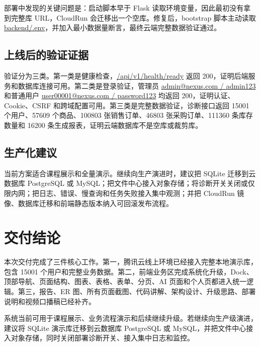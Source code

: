 \documentclass[UTF8,zihao=-4]{ctexart}
\newcommand{\code}[1]{{\small\url{#1}}}
\begin{document}
部署中发现的关键问题是：启动脚本早于 Flask 读取环境变量，因此最初没有拿到完整库 URL，CloudRun 会迁移出一个空库。修复后，bootstrap 脚本主动读取 \code{backend/.env}，并加入最小数据量断言，最终云端完整数据验证通过。

\subsection{上线后的验证证据}
验证分为三类。第一类是健康检查，\code{/api/v1/health/ready} 返回 200，证明后端服务和数据库连接可用。第二类是登录验证，管理员 \code{admin@nexus.com / admin123} 和普通用户 \code{user00001@nexus.com / password123} 均返回 200，证明认证、Cookie、CSRF 和跨域配置可用。第三类是完整数据验证，诊断接口返回 15001 个用户、57609 个商品、100803 张销售订单、46803 张采购订单、111360 条库存数量和 16200 条生成报表，证明云端数据库不是空库或裁剪库。

\subsection{生产化建议}
当前方案适合课程展示和全量演示。继续向生产演进时，建议把 SQLite 迁移到云数据库 PostgreSQL 或 MySQL；把文件中心接入对象存储；将诊断开关关闭或仅限内网；把日志、错误、慢查询和任务失败接入集中观测；并把 CloudRun 镜像、数据库迁移和前端静态版本纳入可回滚发布流程。
\clearpage
\section{交付结论}
本次交付完成了三件核心工作。第一，腾讯云线上环境已经接入完整本地演示库，包含 15001 个用户和完整业务数据。第二，前端业务区完成系统化升级，Dock、顶部导航、页面结构、图表、表格、表单、分页、AI 页面和个人页都进入统一逻辑。第三，报告、ER 图、所有页面截图、代码讲解、架构设计、升级思路、部署说明和视频口播稿已经补齐。

系统当前可用于课程展示、业务流程演示和后续继续升级。若继续向生产级演进，建议将 SQLite 演示库迁移到云数据库 PostgreSQL 或 MySQL，并把文件中心接入对象存储，同时关闭部署诊断开关、接入集中日志和监控。
\end{document}
